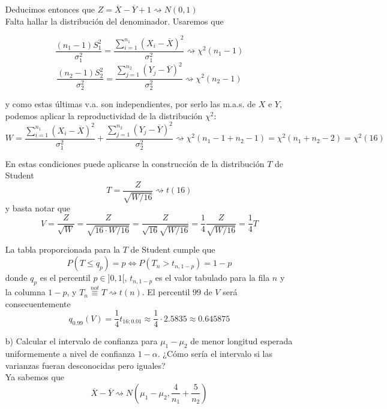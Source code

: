 \documentclass[12pt]{article}
\begin{document}
\begin{ejercicio}
\begin{enumerate}
            Deducimos entonces que $Z = \overline{X} - \overline{Y} + 1 \rightsquigarrow N(0,1)$ \\

            Falta hallar la distribución del denominador. Usaremos que 

            $$\dfrac{(n_1 - 1) S_1^2}{\sigma_1^2} = \dfrac{\displaystyle\sum_{i=1}^{n_1} (X_i - \overline{X})^2}{\sigma_1^2} \rightsquigarrow \chi^2(n_1 -1)$$
            $$\dfrac{(n_2 - 1) S_2^2}{\sigma_2^2} = \dfrac{\displaystyle\sum_{j=1}^{n_2} (Y_j - \overline{Y})^2}{\sigma_2^2} \rightsquigarrow \chi^2(n_2 -1)$$

            y como estas últimas v.a. son independientes, por serlo las m.a.s. de $X$ e $Y$, podemos aplicar la reproductividad de la distribución $\chi^2$:
            $$W = \dfrac{\displaystyle\sum_{i=1}^{n_1} (X_i - \overline{X})^2}{\sigma_1^2} + \dfrac{\displaystyle\sum_{j=1}^{n_2} (Y_j - \overline{Y})^2}{\sigma_2^2}
            \rightsquigarrow \chi^2(n_1 - 1 + n_2 - 1) = \chi^2(n_1 + n_2 - 2) = \chi^2(16)$$

            En estas condiciones puede aplicarse la construcción de la distribución $T$ de Student
            $$T = \dfrac{Z}{\sqrt{W/16}} \rightsquigarrow t(16)$$
            y basta notar que 
            $$V = \dfrac{Z}{\sqrt{W}} = \dfrac{Z}{\sqrt{16 \cdot W/16}} = \dfrac{Z}{\sqrt{16} \sqrt{W/16}} = \dfrac{1}{4} \dfrac{Z}{\sqrt{W/16}} = 
            \dfrac{1}{4} T$$

            La tabla proporcionada para la $T$ de Student cumple que 
            $$P(T \leqslant q_p) = p \iff P(T_n > t_{n,{1-p}}) = 1-p$$
            donde $q_p$ es el percentil $p \in ]0,1[$, $t_{n,1-p}$ es el valor tabulado para la fila $n$ y la columna $1-p$,
            y $T_n \stackrel{not}{\equiv} T \rightsquigarrow t(n)$. El percentil $99$ de $V$ será consecuentemente
            $$q_{0.99}(V) = \dfrac{1}{4} t_{16; 0.01} \approx \dfrac{1}{4} \cdot 2.5835 \approx 0.645875$$

            \item[b)] Calcular el intervalo de confianza para $\mu_1-\mu_2$ de menor longitud esperada
            uniformemente a nivel de confianza $1-\alpha$. ¿Cómo sería el intervalo si las varianzas 
            fueran desconocidas pero iguales? \\

            Ya sabemos que $$\overline{X} - \overline{Y} \rightsquigarrow 
            N \left( \mu_1 - \mu_2, \dfrac{4}{n_1} + \dfrac{5}{n_2} \right)$$


\end{enumerate}
\end{ejercicio}
\end{document}
